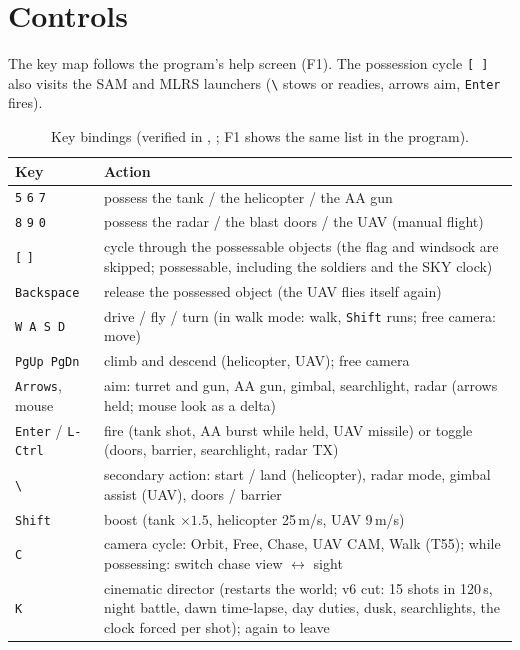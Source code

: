 \section{Controls}\label{app:controls}
The key map follows the program's help screen (F1). The possession cycle \texttt{[ ]} also visits the SAM and MLRS launchers (\texttt{\textbackslash} stows or readies, arrows aim, \texttt{Enter} fires).

\begin{table}[h]
\centering\small
\caption{Key bindings (verified in , ; F1 shows the same list in the program).}
\label{tab:keys}
\begin{tabular}{@{}p{3.6cm}p{12.4cm}@{}}
\toprule
Key & Action\\\midrule
\texttt{5} \texttt{6} \texttt{7} & possess the tank / the helicopter / the AA gun\\
\texttt{8} \texttt{9} \texttt{0} & possess the radar / the blast doors / the UAV (manual flight)\\
\texttt{[} \texttt{]} & cycle through the possessable objects (the flag and windsock are skipped; \nPossessable{} possessable, including the soldiers and the SKY clock)\\
\texttt{Backspace} & release the possessed object (the UAV flies itself again)\\
\texttt{W A S D} & drive / fly / turn (in walk mode: walk, \texttt{Shift} runs; free camera: move)\\
\texttt{PgUp PgDn} & climb and descend (helicopter, UAV); free camera\\
\texttt{Arrows}, mouse & aim: turret and gun, AA gun, gimbal, searchlight, radar (arrows held; mouse look as a delta)\\
\texttt{Enter} / \texttt{L-Ctrl} & fire (tank shot, AA burst while held, UAV missile) or toggle (doors, barrier, searchlight, radar TX)\\
\texttt{\textbackslash} & secondary action: start / land (helicopter), radar mode, gimbal assist (UAV), doors / barrier\\
\texttt{Shift} & boost (tank $\times1.5$, helicopter 25\,m/s, UAV 9\,m/s)\\
\texttt{C} & camera cycle: Orbit, Free, Chase, UAV CAM, Walk (T55); while possessing: switch chase view $\leftrightarrow$ sight\\
\texttt{K} & cinematic director (restarts the world; v6 cut: 15 shots in 120\,s, night battle, dawn time-lapse, day duties, dusk, searchlights, the clock forced per shot); again to leave\\

\end{tabular}
\end{table}
